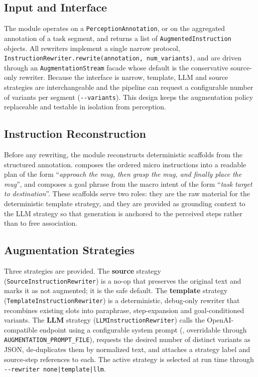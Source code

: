 \documentclass[11pt,oneside]{report}
\begin{document}
\subsection{Input and Interface}
The module operates on a \texttt{PerceptionAnnotation}, or on the aggregated
annotation of a task segment, and returns a list of
\texttt{AugmentedInstruction} objects. All rewriters implement a single narrow
protocol, \texttt{InstructionRewriter.rewrite(annotation, num\_variants)}, and
are driven through an \texttt{AugmentationStream} facade whose default is the
conservative source-only rewriter. Because the interface is narrow, template,
LLM and source strategies are interchangeable and the pipeline can request a
configurable number of variants per segment (\texttt{-{}-variants}). This design
keeps the augmentation policy replaceable and testable in isolation from
perception.

\subsection{Instruction Reconstruction}
Before any rewriting, the module reconstructs deterministic scaffolds from the
structured annotation.  composes the ordered micro
instructions into a readable plan of the form ``\emph{approach the mug, then
grasp the mug, and finally place the mug}'', and 
composes a goal phrase from the macro intent of the form ``\emph{task target to
destination}''. These scaffolds serve two roles: they are the raw material for
the deterministic template strategy, and they are provided as grounding context
to the LLM strategy so that generation is anchored to the perceived steps rather
than to free association.

\subsection{Augmentation Strategies}
Three strategies are provided. The \textbf{source} strategy
(\texttt{SourceInstructionRewriter}) is a no-op that preserves the original text
and marks it as not augmented; it is the safe default. The \textbf{template}
strategy (\texttt{TemplateInstructionRewriter}) is a deterministic, debug-only
rewriter that recombines existing slots into paraphrase, step-expansion and
goal-conditioned variants. The \textbf{LLM} strategy
(\texttt{LLMInstructionRewriter}) calls the OpenAI-compatible endpoint using a
configurable system prompt
(, overridable through
\texttt{AUGMENTATION\_PROMPT\_FILE}), requests the desired number of distinct
variants as JSON, de-duplicates them by normalized text, and attaches a strategy
label and source-step references to each. The active strategy is selected at run
time through \texttt{-{}-rewriter none|template|llm}.
\end{document}
